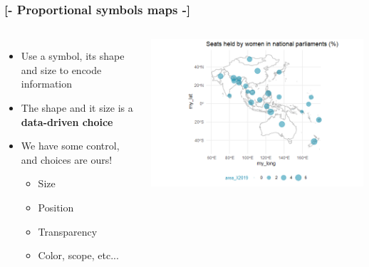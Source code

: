 \documentclass[xcolor=x11names,aspectratio=169, compress]{beamer}
\renewcommand{\(}{\begin{columns}}
\renewcommand{\)}{\end{columns}}
\newcommand{\<}[1]{\begin{column}{#1}}
\renewcommand{\>}{\end{column}}
\begin{document}
\begin{frame} %
\frametitle{\textcolor{brique}{[-  \textbf{Proportional symbols maps} -]}}
  \begin{columns}
    \begin{itemize}[<+-|alert@+>]
        \item Use a symbol, its shape and size to encode information
        \item The shape and it size is a \textbf{data-driven choice}
        \item We have some control, and choices are ours!
            \begin{itemize}[<+-|alert@+>]
                \item  Size
                \item  Position
                \item  Transparency
                \item  Color, scope, etc...  %
            \end{itemize}
        \end{itemize}
        \includegraphics[width = 1.0\textwidth]{ShareWomenParliamentSymb-Small.png}
    \end{columns}
\end{frame}
\end{document}
